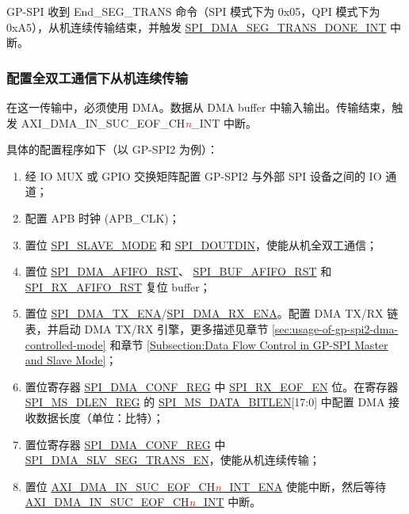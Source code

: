 \documentclass[main\_\_CN.tex]{subfiles}
\begin{document}
GP-SPI 收到 End\_SEG\_TRANS 命令（SPI 模式下为 0x05，QPI 模式下为 0xA5），从机连续传输结束，并触发 \hyperref[int:SPIDMASEGTRANSDONEINT]{ SPI\_DMA\_SEG\_TRANS\_DONE\_INT} 中断。

\subsubsection{配置全双工通信下从机连续传输}\label{sec:gp-spi2-slave-fd-seg-trans}
在这一传输中，必须使用 DMA。数据从 DMA buffer 中输入输出。传输结束，触发 AXI\_DMA\_IN\_SUC\_EOF\_CH\textcolor{red}{\it{n}}\_INT  中断。

具体的配置程序如下（以 GP-SPI2 为例）：

\begin{enumerate}
   \item 经 IO MUX 或 GPIO 交换矩阵配置 GP-SPI2 与外部 SPI 设备之间的 IO 通道； 
   \item 配置 APB 时钟 (APB\_CLK)；

    \item 置位 \hyperref[fielddesc:SPISLAVEMODE]{SPI\_SLAVE\_MODE} 和 \hyperref[fielddesc:SPIDOUTDIN]{SPI\_DOUTDIN}，使能从机全双工通信；
    
    \item 置位 \hyperref[fielddesc:SPIDMAAFIFORST]{SPI\_DMA\_AFIFO\_RST}、 \hyperref[fielddesc:SPIBUFAFIFORST]{SPI\_BUF\_AFIFO\_RST} 和 \hyperref[fielddesc:SPIRXAFIFORST]{SPI\_RX\_AFIFO\_RST} 复位 buffer；
        
    \item 置位 \hyperref[fielddesc:SPIDMATXENA]{SPI\_DMA\_TX\_ENA}/\hyperref[fielddesc:SPIDMARXENA]{SPI\_DMA\_RX\_ENA}。配置 DMA TX/RX 链表，并启动 DMA TX/RX 引擎，更多描述见章节 \ref{sec:usage-of-gp-spi2-dma-controlled-mode} 和章节 \ref{Subsection:Data Flow Control in GP-SPI Master and Slave Mode}；
    
    \item 置位寄存器 \hyperref[regdesc:SPIDMACONFREG]{SPI\_DMA\_CONF\_REG} 中 \hyperref[fielddesc:SPIRXEOFEN]{SPI\_RX\_EOF\_EN} 位。在寄存器 \hyperref[regdesc:SPIMSDLENREG]{SPI\_MS\_DLEN\_REG} 的 \hyperref[fielddesc:SPIMSDATABITLEN]{SPI\_MS\_DATA\_BITLEN}[17:0] 中配置 DMA 接收数据长度（单位：比特）；
    
    \item 置位寄存器 \hyperref[regdesc:SPIDMACONFREG]{SPI\_DMA\_CONF\_REG} 中 \hyperref[fielddesc:SPIDMASLVSEGTRANSEN]{SPI\_DMA\_SLV\_SEG\_TRANS\_EN}，使能从机连续传输；
    
    \item 置位 \hyperref[fielddesc:AXIDMAINSUCEOFCHNINTENA]{AXI\_DMA\_IN\_SUC\_EOF\_CH\textcolor{red}{\it{n}}\_INT\_ENA}  使能中断，然后等待 \hyperref[int:GDMAINSUCEOFINT]{AXI\_DMA\_IN\_SUC\_EOF\_CH\textcolor{red}{\it{n}}\_INT} 中断。
\end{enumerate}
\end{document}
